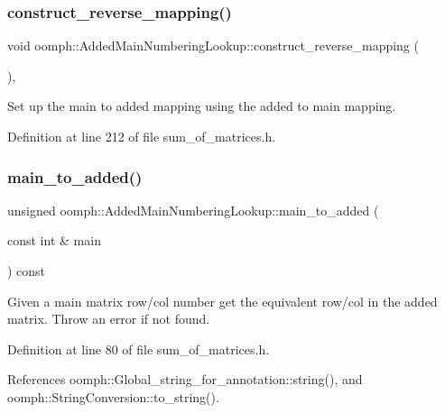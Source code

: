 \subsubsection{\texorpdfstring{construct\+\_\+reverse\+\_\+mapping()}{construct\_reverse\_mapping()}}
{\footnotesize\ttfamily void oomph\+::\+Added\+Main\+Numbering\+Lookup\+::construct\+\_\+reverse\+\_\+mapping (\begin{DoxyParamCaption}{ }\end{DoxyParamCaption})\hspace{0.3cm}{\ttfamily [inline]}, {\ttfamily [private]}}



Set up the main to added mapping using the added to main mapping. 



Definition at line 212 of file sum\+\_\+of\+\_\+matrices.\+h.

\mbox{\label{classoomph_1_1AddedMainNumberingLookup_a3602f98bdd41d51ac36efeafdb58ceb0}} 
\subsubsection{\texorpdfstring{main\+\_\+to\+\_\+added()}{main\_to\_added()}}
{\footnotesize\ttfamily unsigned oomph\+::\+Added\+Main\+Numbering\+Lookup\+::main\+\_\+to\+\_\+added (\begin{DoxyParamCaption}\item[{const int \&}]{main }\end{DoxyParamCaption}) const\hspace{0.3cm}{\ttfamily [inline]}}



Given a main matrix row/col number get the equivalent row/col in the added matrix. Throw an error if not found. 



Definition at line 80 of file sum\+\_\+of\+\_\+matrices.\+h.



References oomph\+::\+Global\+\_\+string\+\_\+for\+\_\+annotation\+::string(), and oomph\+::\+String\+Conversion\+::to\+\_\+string().

